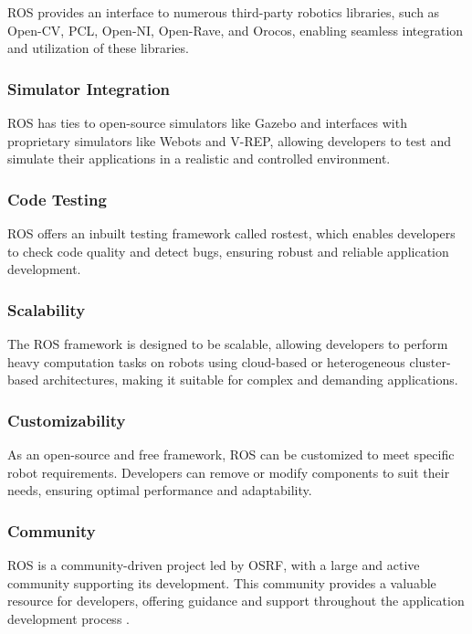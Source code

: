 ROS provides an interface to numerous third-party robotics libraries, such as Open-CV, PCL, Open-NI, Open-Rave, and Orocos, enabling seamless integration and utilization of these libraries.

\subsubsection{Simulator Integration}

ROS has ties to open-source simulators like Gazebo and interfaces with proprietary simulators like Webots and V-REP, allowing developers to test and simulate their applications in a realistic and controlled environment.

\subsubsection{Code Testing}

ROS offers an inbuilt testing framework called rostest, which enables developers to check code quality and detect bugs, ensuring robust and reliable application development.

\subsubsection{Scalability}

The ROS framework is designed to be scalable, allowing developers to perform heavy computation tasks on robots using cloud-based or heterogeneous cluster-based architectures, making it suitable for complex and demanding applications.

\subsubsection{Customizability}

As an open-source and free framework, ROS can be customized to meet specific robot requirements. Developers can remove or modify components to suit their needs, ensuring optimal performance and adaptability.

\subsubsection{Community}

ROS is a community-driven project led by OSRF, with a large and active community supporting its development. This community provides a valuable resource for developers, offering guidance and support throughout the application development process \cite{joseph2017ros}.


